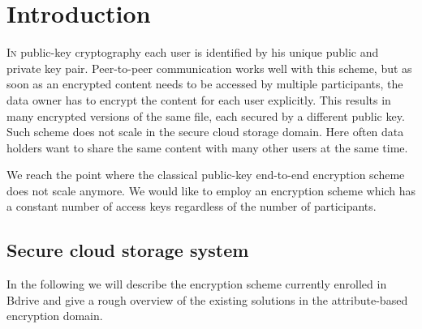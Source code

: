 \section{Introduction}
\label{sec:introduction}
\lettrine[nindent=0em,lines=3]{I}n public-key cryptography each user is identified by his unique public and private key pair. Peer-to-peer communication works well with this scheme, but as soon as an encrypted content needs to be accessed by multiple participants, the data owner has to encrypt the content for each user explicitly. This results in many encrypted versions of the same  file, each secured by a different public key. Such scheme does not scale in the secure cloud storage domain. Here often data holders want to share the same content with many other users at the same time.

We reach the point where the classical public-key end-to-end encryption scheme does not scale anymore. We would like to employ an encryption scheme which has a constant number of access keys regardless of the number of participants.

\subsection{Secure cloud storage system}
In the following we will describe the encryption scheme currently enrolled in Bdrive and give a rough overview of the existing solutions in the attribute-based encryption domain.

